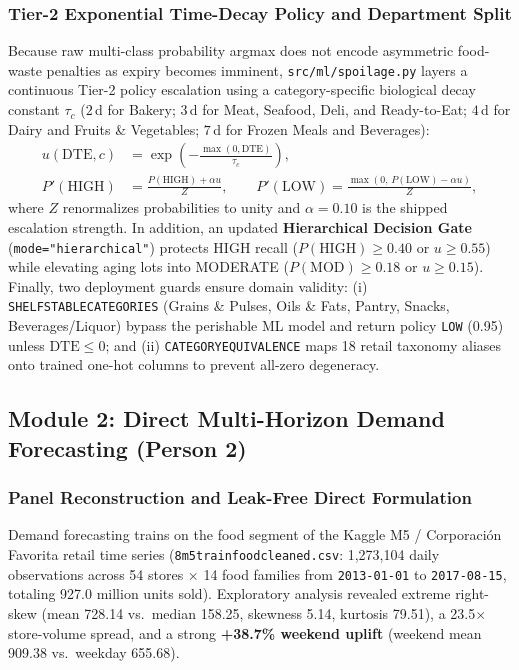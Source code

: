 \documentclass[11pt,a4paper]{article}
\renewcommand{\_}{\oldunderscore\allowbreak}
\begin{document}
\subsubsection{Tier-2 Exponential Time-Decay Policy and Department Split}
Because raw multi-class probability argmax does not encode asymmetric food-waste penalties as expiry becomes imminent, \texttt{src/ml/spoilage.py} layers a continuous Tier-2 policy escalation using a category-specific biological decay constant $\tau_c$ ($2$\,d for Bakery; $3$\,d for Meat, Seafood, Deli, and Ready-to-Eat; $4$\,d for Dairy and Fruits \& Vegetables; $7$\,d for Frozen Meals and Beverages):
\begin{align}
    u(\text{DTE}, c) &= \exp\!\left(-\frac{\max(0, \text{DTE})}{\tau_c}\right), \\
    P'(\text{HIGH}) &= \frac{P(\text{HIGH}) + \alpha u}{Z}, \qquad
    P'(\text{LOW}) = \frac{\max(0,\, P(\text{LOW}) - \alpha u)}{Z},
\end{align}
where $Z$ renormalizes probabilities to unity and $\alpha = 0.10$ is the shipped escalation strength. In addition, an updated \textbf{Hierarchical Decision Gate} (\texttt{mode="hierarchical"}) protects HIGH recall ($P(\text{HIGH}) \ge 0.40$ or $u \ge 0.55$) while elevating aging lots into MODERATE ($P(\text{MOD}) \ge 0.18$ or $u \ge 0.15$). Finally, two deployment guards ensure domain validity: (i) \texttt{SHELF\_STABLE\_CATEGORIES} (Grains \& Pulses, Oils \& Fats, Pantry, Snacks, Beverages/Liquor) bypass the perishable ML model and return policy \texttt{LOW} (0.95) unless $\text{DTE} \le 0$; and (ii) \texttt{CATEGORY\_EQUIVALENCE} maps 18 retail taxonomy aliases onto trained one-hot columns to prevent all-zero degeneracy.

\subsection{Module 2: Direct Multi-Horizon Demand Forecasting (Person 2)}
\label{sec:forecast_method}

\subsubsection{Panel Reconstruction and Leak-Free Direct Formulation}
Demand forecasting trains on the food segment of the Kaggle M5 / Corporación Favorita retail time series (\texttt{8\_m5\_train\_food\_cleaned.csv}: 1,273,104 daily observations across 54 stores $\times$ 14 food families from \texttt{2013-01-01} to \texttt{2017-08-15}, totaling 927.0 million units sold). Exploratory analysis revealed extreme right-skew (mean 728.14 vs.\ median 158.25, skewness 5.14, kurtosis 79.51), a 23.5$\times$ store-volume spread, and a strong \textbf{+38.7\% weekend uplift} (weekend mean 909.38 vs.\ weekday 655.68).
\end{document}
